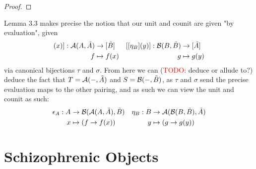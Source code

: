 \documentclass[12pt,a4paper]{article}
\def\HomA{\ensuremath\mathcal{A}}
\def\HomB{\ensuremath\mathcal{B}}
\def\t{\ensuremath\tilde}
\begin{document}
\begin{proof}
\end{proof}
Lemma 3.3 makes precise the notion that our unit and counit are given "by evaluation", given
\begin{align*}
	[[\epsilon_A](x)]: \HomA(A, \t A) &\to [\t B] & [[\eta_B](y)]:\HomB(B, \t B) &\to [\t A]\\
	f &\mapsto f(x) & g &\mapsto g(y) 
\end{align*}
via canonical bijections $\tau$ and $\sigma$. From here we can (\textcolor{red}{TODO}: deduce or allude to?) deduce the fact that $T = \HomA(-, \t A)$ and $S = \HomB(-, \t B)$, as $\tau$ and $\sigma$ send the precise evaluation maps to the other pairing, and as such we can view the unit and counit as such:
\begin{align*}
	\epsilon_A:  A&\to \HomB(\HomA(A, \t A),\t B) & \eta_B: B&\to \HomA(\HomB(B, \t B),\t A)\\
	x &\mapsto (f \to f(x)) & y &\mapsto (g\to g(y) )
\end{align*}
\section{Schizophrenic Objects}
\end{document}
